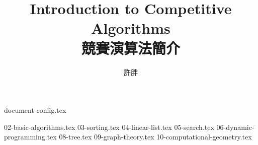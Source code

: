 \documentclass[12pt,a4paper,oneside]{book}
\begin{document}
\begin{CJK}{UTF8}{bkai}

{document-config.tex}
\title{Introduction to Competitive Algorithms\\競賽演算法簡介}
\author{許胖}
\maketitle
\tableofcontents

\setcounter{chapter}{1}
{02-basic-algorithms.tex}
{03-sorting.tex}
{04-linear-list.tex}
{05-search.tex}
{06-dynamic-programming.tex}
\setcounter{chapter}{7}
{08-tree.tex}
{09-graph-theory.tex}
{10-computational-geometry.tex}

\printindex[noun]

\listoffigures
\clearpage
\end{CJK}
\end{document}
